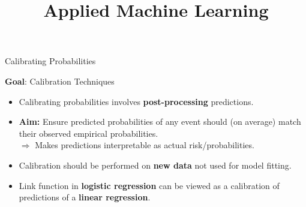 \documentclass[11pt,compress,t,notes=noshow, xcolor=table]{beamer}
\begin{document}
\title{Applied Machine Learning}



\begin{frame}{Calibrating Probabilities}

\textbf{Goal}: Calibration Techniques

\begin{itemize}
  \item Calibrating probabilities involves \textbf{post-processing} predictions. %
  \item \textbf{Aim:} Ensure predicted probabilities of any event should (on average) match their observed empirical probabilities.\\
    $\Rightarrow$ Makes predictions interpretable as actual risk/probabilities.
  \item Calibration should be performed on \textbf{new data} not used for model fitting.
  \item Link function in \textbf{logistic regression} can be viewed as a calibration of predictions of a \textbf{linear regression}.
\end{itemize}

\end{frame}


\end{document}
